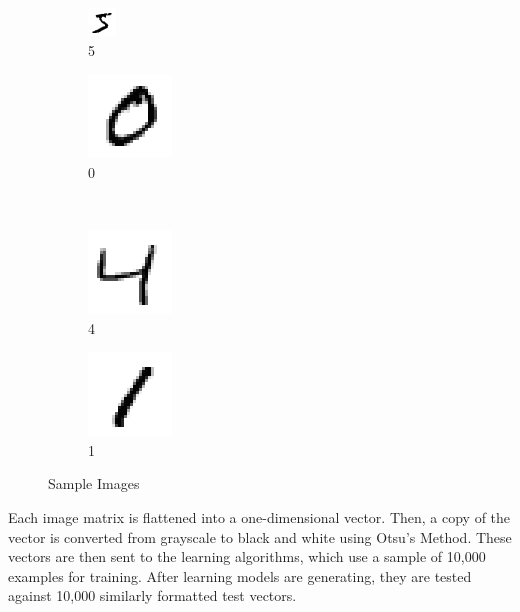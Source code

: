 \documentclass[12pt]{article}
\begin{document}
\begin{figure}[h]
\centering
\begin{subfigure}{.25\textwidth}
  \centering
  \includegraphics[width=.2\linewidth]{0.png}
  \caption{5}
  \label{fig:sub1}
\end{subfigure}%
\hspace{4mm}
\begin{subfigure}{.25\textwidth}
  \centering
  \includegraphics[width=.2\linewidth]{1.png}
  \caption{0}
  \label{fig:sub2}
\end{subfigure}
\\
\begin{subfigure}{.25\textwidth}
  \centering
  \includegraphics[width=.2\linewidth]{2.png}
  \caption{4}
  \label{fig:sub3}
\end{subfigure}
\begin{subfigure}{.25\textwidth}
  \centering
  \includegraphics[width=.2\linewidth]{3.png}
  \caption{1}
  \label{fig:sub4}
\end{subfigure}
\caption{Sample Images}
\label{fig:test}
\end{figure}

Each image matrix is flattened into a one-dimensional vector. Then, a copy of the vector is converted from grayscale to black and white using Otsu’s Method. These vectors are then sent to the learning algorithms, which use a sample of 10,000 examples for training. After learning models are generating, they are tested against 10,000 similarly formatted test vectors.
\end{document}
